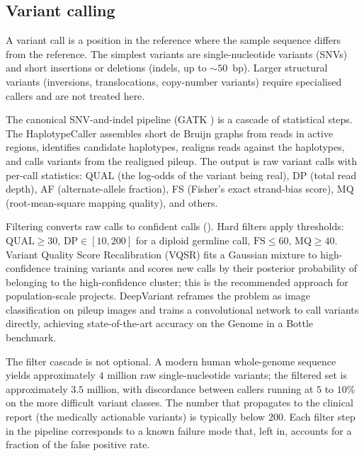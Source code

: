 \subsection{Variant calling}

A variant call is a position in the reference where the sample
sequence differs from the reference. The simplest variants are
single-nucleotide variants (SNVs) and short insertions or deletions
(indels, up to $\sim 50$~bp). Larger structural variants (inversions,
translocations, copy-number variants) require specialised callers and
are not treated here.

The canonical SNV-and-indel pipeline (GATK
\cite{paper:v6c11-mckenna-gatk-2010}) is a cascade of statistical
steps. The HaplotypeCaller assembles short de Bruijn graphs from reads
in active regions, identifies candidate haplotypes, realigns reads
against the haplotypes, and calls variants from the realigned pileup.
The output is raw variant calls with per-call statistics: QUAL (the
log-odds of the variant being real), DP (total read depth), AF
(alternate-allele fraction), FS (Fisher's exact strand-bias score),
MQ (root-mean-square mapping quality), and others.

Filtering converts raw calls to confident calls
(). Hard filters apply
thresholds: $\mathrm{QUAL} \geq 30$, $\mathrm{DP} \in [10, 200]$ for a
diploid germline call, $\mathrm{FS} \leq 60$, $\mathrm{MQ} \geq 40$.
Variant Quality Score Recalibration (VQSR) fits a Gaussian mixture to
high-confidence training variants and scores new calls by their
posterior probability of belonging to the high-confidence cluster;
this is the recommended approach for population-scale projects.
DeepVariant \cite{paper:v6c11-poplin-deepvariant-2018} reframes the
problem as image classification on pileup images and trains a
convolutional network to call variants directly, achieving
state-of-the-art accuracy on the Genome in a Bottle benchmark.



The filter cascade is not optional. A modern human whole-genome
sequence yields approximately $4$ million raw single-nucleotide
variants; the filtered set is approximately $3.5$ million, with
discordance between callers running at $5$ to $10\%$ on the more
difficult variant classes. The number that propagates to the clinical
report (the medically actionable variants) is typically below $200$.
Each filter step in the pipeline corresponds to a known failure mode
that, left in, accounts for a fraction of the false positive rate.

